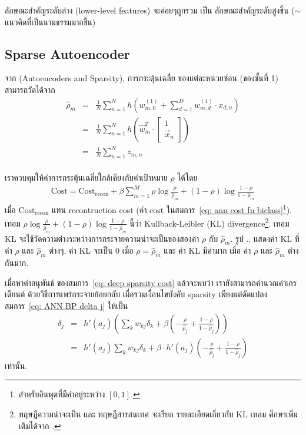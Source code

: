 ลักษณะสำคัญระดับล่าง (lower-level features) จะค่อยๆถูกรวม เป็น ลักษณะสำคัญระดับสูงขึ้น ($\sim$ แนวคิดที่เป็นนามธรรมมากขึ้น)



\subsection{Sparse Autoencoder}

จาก \cite{ufldl} (Autoencoders and Sparsity), การกระตุ้นเฉลี่ย ของแต่ละหน่วยซ่อน (ของชั้นที่ 1) สามารถวัดได้จาก
\begin{eqnarray}
 \hat{\rho}_m &=& \frac{1}{N} \sum_{n=1}^N h \left( 
w^{(1)}_{m,0} + \sum_{d=1}^D w^{(1)}_{m,d} \cdot x_{d,n} \right)
 \nonumber \\ 
&=& \frac{1}{N} \sum_{n=1}^N h \left( 
 \vec{w}^T_m
  \cdot \begin{bmatrix}
 1 \\
 \vec{x}_n
 \end{bmatrix} \right)
 \nonumber \\ 
&=& \frac{1}{N} \sum_{n=1}^N z_{m,n}
 \nonumber \\  
\label{eq: deep sparse rhohat} 
\end{eqnarray}

เราควบคุมให้ค่าการกระตุ้นเฉลี่ยใกล้เคียงกับค่าเป้าหมาย $\rho$ ได้โดย
\begin{eqnarray}
 \mathrm{Cost} = \mathrm{Cost}_{\mathrm{recon}} 
  + \beta \sum_{m=1}^M \rho \log \frac{\rho}{\hat{\rho}_m} + (1 - \rho) \log \frac{1 - \rho}{1 - \hat{\rho}_m}
\label{eq: deep sparsity cost}  
\end{eqnarray}
เมื่อ $\mathrm{Cost}_{\mathrm{recon}}$ แทน recontruction cost (ค่า cost ในสมการ~\ref{eq: ann cost fn biclass}\footnote{สำหรับอินพุตที่มีค่าอยู่ระหว่าง $[0,1]$.}).
เทอม $\rho \log \frac{\rho}{\hat{\rho}_m} + (1 - \rho) \log \frac{1 - \rho}{1 - \hat{\rho}_m}$ นี้ว่า Kullback-Leibler (KL) divergence\footnote{ทฤษฎีความน่าจะเป็น และ ทฤษฎีสารสนเทศ จะเรียก 
รายละเอียดเกี่ยวกับ KL เทอม ศึกษาเพิ่มเติมได้จาก \cite{KullbackLeibler1951a}.
}.
เทอม KL จะใช้วัดความต่างระหว่างการกระจายความน่าจะเป็นของสองค่า $\rho$ กับ $\hat{\rho}_m$.
รูป .. แสดงค่า KL ที่ค่า $\rho$ และ $\hat{\rho}_m$ ต่างๆ. 
ค่า KL จะเป็น $0$ เมื่อ $\rho = \hat{\rho}_m$ และ ค่า KL มีค่ามาก เมื่อ ค่า $\rho$ และ $\hat{\rho}_m$ ต่างกันมาก.

เมื่อหาค่าอนุพันธ์ ของสมการ~\ref{eq: deep sparsity cost} 
แล้วจะพบว่า เรายังสามารถคำนวณค่าเกรเดียนต์ ด้วยวิธีการแพร่กระจายย้อยกลับ
เมื่อรวมเงื่อนไขบังคับ sparsity เพียงแต่ดัดแปลง สมการ~\ref{eq: ANN BP delta j} ให้เป็น
\begin{eqnarray}
  \delta_j &=& h'(a_j) \left( \sum_k w_{kj} \delta_k + \beta \left( -\frac{\rho}{\hat{\rho}_j} + \frac{1 - \rho}{1 - \hat{\rho}_j} \right) \right)
\nonumber \\
&=& h'(a_j) \sum_k w_{kj} \delta_k + \beta \cdot h'(a_j) \left( -\frac{\rho}{\hat{\rho}_j} + \frac{1 - \rho}{1 - \hat{\rho}_j} \right)
\label{eq: deep BP delta j sparsity}
\end{eqnarray}
เท่านั้น.
% 


